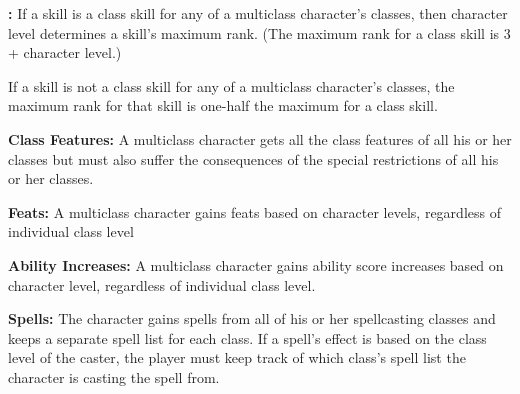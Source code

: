 \textbf{:} If a skill is a class skill for any of a multiclass character's classes, then character level determines a skill's maximum rank. (The maximum rank for a class skill is 3 + character level.)

If a skill is not a class skill for any of a multiclass character's classes, the maximum rank for that skill is one-half the maximum for a class skill.

\textbf{Class Features:} A multiclass character gets all the class features of all his or her classes but must also suffer the consequences of the special restrictions of all his or her classes.

\textbf{Feats:} A multiclass character gains feats based on character levels, regardless of individual class level

\textbf{Ability Increases:} A multiclass character gains ability score increases based on character level, regardless of individual class level.

\textbf{Spells:} The character gains spells from all of his or her spellcasting classes and keeps a separate spell list for each class. If a spell's effect is based on the class level of the caster, the player must keep track of which class's spell list the character is casting the spell from.

\pagebreak